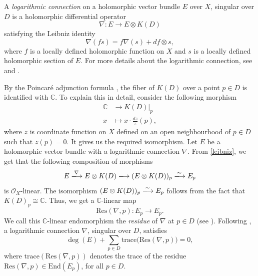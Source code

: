 \documentclass[11pt, reqno]{amsart}
\numberwithin{equation}{section}
\theoremstyle{definition}
\begin{document}
	A \textit{logarithmic connection} on a holomorphic vector bundle $E$ over $X$, singular over $D$ is a holomorphic differential operator
	\[
	\nabla : E \to E \otimes K(D) 
	\]
	satisfying the Leibniz identity
	\begin{equation}\label{leibniz}
	    \nabla(fs)= f\nabla(s) + df\otimes s,
	\end{equation}
	where $f$ is a locally defined holomorphic function on $X$ and $s$ is a locally defined holomorphic section of $E$. For more details about the logarithmic connection, see \cite{D70} and \cite{BGKHME87}. 

 By the Poincaré adjunction formula \cite[p. $146$]{GH78}, the fiber of $K(D)$ over a point $p\in D$ is identified with $\mathbb{C}$. To explain this in detail, consider the following morphism
 \begin{align*}
 \mathbb{C} &\longrightarrow \left.K(D)\right|_p \\ 
 x &\mapsto x\cdot \frac{dz}{z}(p),
 \end{align*}
where $z$ is coordinate function on $X$ defined on an open neighbourhood of $p\in D$ such that $z(p)=0$. It gives us the required isomorphism.
Let $E$ be a holomorphic vector bundle with a logarithmic connection $\nabla$. From \eqref{leibniz}, we get that the following composition of morphisms
\[
E \xlongrightarrow[]{\nabla} E \otimes K(D) \xlongrightarrow[]{} (E \otimes K(D))_p \xlongrightarrow[]{\sim} E_p
\]
is $\mathcal{O}_X$-linear. The isomorphism $(E \otimes K(D))_p \xlongrightarrow[]{\sim} E_p$ follows from the fact that $K(D)_p \cong \mathbb{C}$. Thus, we get a $\mathbb{C}$-linear map
\[
\mathrm{Res}(\nabla,p) : E_p \longrightarrow E_p.
\]
We call this $\mathbb{C}$-linear endomorphism the \textit{residue} of $\nabla$ at $p\in D$ (see \cite{D70}). Following \cite[Theorem $3$]{O82}, a logarithmic connection $\nabla$, singular over $D$, satisfies
\begin{equation}\label{residue}
    \deg(E) + \sum_{p\in D} \mathrm{trace}\big(\mathrm{Res}(\nabla, p)\big) = 0,
\end{equation}
where $\mathrm{trace}(\mathrm{Res}(\nabla, p))$ denotes the trace of the residue $\mathrm{Res}(\nabla, p) \in \mathrm{End}(E_p)$, for all $p \in D$.
\end{document}
